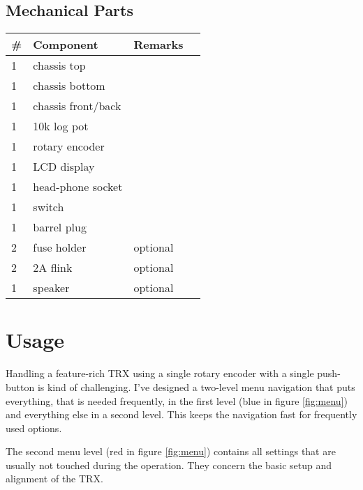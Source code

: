 \documentclass[10pt, a4paper]{scrartcl}
\begin{document}
\subsection{Mechanical Parts}
\begin{longtable}{|l|p{6cm}|l|l|} \hline 
\# & Component & Remarks \\ \hline 
1 & chassis top & \\
1 & chassis bottom & \\
1 & chassis front/back & \\
1 & 10k log pot & \\
1 & rotary encoder & \\
1 & LCD display & \\
1 & head-phone socket & \\
1 & switch & \\
1 & barrel plug & \\
2 & fuse holder & optional \\
2 & 2A flink & optional \\
1 & speaker & optional \\ \hline
\end{longtable}


\clearpage
\section{Usage} \label{sec:user}
Handling a feature-rich TRX using a single rotary encoder with a single push-button is kind of challenging. I've designed a two-level menu navigation that puts everything, that is needed frequently, in the first level (blue in figure \ref{fig:menu}) and everything else in a second level. This keeps the navigation fast for frequently used options. 

The second menu level (red in figure \ref{fig:menu}) contains all settings that are usually not touched during the operation. They concern the basic setup and alignment of the TRX. 
\end{document}
